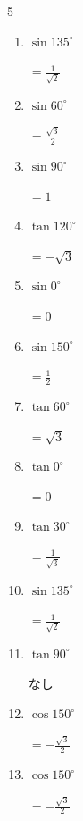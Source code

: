 \begin{multicols}{5}
\begin{enumerate}
  \item $\displaystyle \sin{135^\circ}$

        $\displaystyle =\frac{1}{\sqrt{2}}$

  \item $\displaystyle \sin{60^\circ}$

        $\displaystyle =\frac{\sqrt{3}}{2}$

  \item $\displaystyle \sin{90^\circ}$

        $\displaystyle =1$

  \item $\displaystyle \tan{120^\circ}$

        $\displaystyle =-\sqrt{3}$

  \item $\displaystyle \sin{0^\circ}$

        $\displaystyle =0$

  \item $\displaystyle \sin{150^\circ}$

        $\displaystyle =\frac{1}{2}$

  \item $\displaystyle \tan{60^\circ}$

        $\displaystyle =\sqrt{3}$

  \item $\displaystyle \tan{0^\circ}$

        $\displaystyle =0$

  \item $\displaystyle \tan{30^\circ}$

        $\displaystyle =\frac{1}{\sqrt{3}}$

  \item $\displaystyle \sin{135^\circ}$

        $\displaystyle =\frac{1}{\sqrt{2}}$

  \item $\displaystyle \tan{90^\circ}$

        $\displaystyle なし$

\columnbreak %

  \item $\displaystyle \cos{150^\circ}$

        $\displaystyle =-\frac{\sqrt{3}}{2}$

  \item $\displaystyle \cos{150^\circ}$

        $\displaystyle =-\frac{\sqrt{3}}{2}$


\end{enumerate}
\end{multicols}

